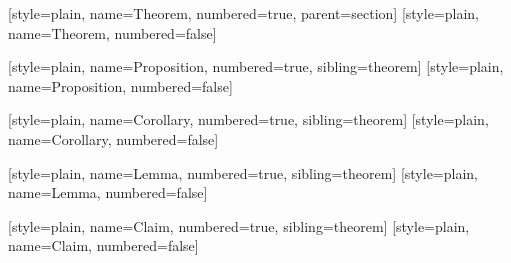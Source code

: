 
\usepackage{amsmath,amsthm,amsfonts,amssymb}
\usepackage{mathtools}
\usepackage{mathrsfs}
\usepackage{bm}
\usepackage{extarrows}
\usepackage[a4paper, margin=1in]{geometry}
\usepackage{float}
\usepackage{indentfirst}
\usepackage{anyfontsize}
\usepackage{booktabs,multirow,multicol}
\usepackage[shortlabels,inline]{enumitem}
\usepackage{appendix}

\usepackage[dvipsnames]{xcolor}
\usepackage{graphicx}
\graphicspath{
    {./figure/}{./figures/}{./image/}{./images/}{./graphic/}{./graphics/}{./picture/}{./pictures/}
}
\usepackage{subcaption}

\usepackage[ruled,linesnumbered,noline]{algorithm2e}
\usepackage{listings}
\lstset{style=simpleStyle}

\usepackage{hyperref}
\hypersetup{
    colorlinks=true,linkcolor=,urlcolor=cyan
}

\renewcommand*{\proofname}{\normalfont\bfseries Proof}

\usepackage{keytheorems}


[style=plain, name=Theorem, numbered=true, parent=section]
[style=plain, name=Theorem, numbered=false]

[style=plain, name=Proposition, numbered=true, sibling=theorem]
[style=plain, name=Proposition, numbered=false]

[style=plain, name=Corollary, numbered=true, sibling=theorem]
[style=plain, name=Corollary, numbered=false]

[style=plain, name=Lemma, numbered=true, sibling=theorem]
[style=plain, name=Lemma, numbered=false]

[style=plain, name=Claim, numbered=true, sibling=theorem]
[style=plain, name=Claim, numbered=false]

